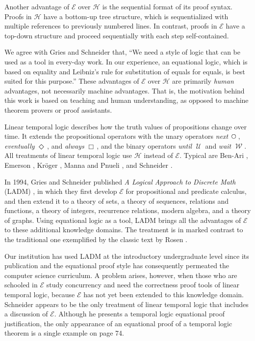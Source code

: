 \documentclass[12pt, fleqn, leqno]{article}
\newcommand{\Until}{\;\mathcal{U}\;}
\newcommand{\Wait}{\;\mathcal{W}\;}
\newcommand{\Next}{\;\,\text{\raisebox{3.5pt}{\circle{6}}}}
\newcommand{\Event}{\Diamond\,}
\newcommand{\Always}{\Box\,}
\begin{document}
Another advantage of $\mathcal{E}$ over $\mathcal{H}$ is the sequential format of its proof syntax.
Proofs in $\mathcal{H}$ have a bottom-up tree structure, which is sequentialized with multiple references to previously numbered lines.
In contrast, proofs in $\mathcal{E}$ have a top-down structure and proceed sequentially with each step self-contained.

We agree with Gries and Schneider \cite{LADM} that, ``We need a style of logic that can be used as a tool in every-day work.
In our experience, an equational logic, which is based on equality and Leibniz's rule for substitution of equals for equals, is best suited for this purpose.''
These advantages of $\mathcal{E}$ over $\mathcal{H}$ are primarily \textit{human} advantages, not necessarily machine advantages.
That is, the motivation behind this work is based on teaching and human understanding, as opposed to machine theorem provers or proof assistants.

Linear temporal logic describes how the truth values of propositions change over time.
It extends the propositional operators with the unary operators \textit{next} $\Next$, \textit{eventually} $\Event$, and \textit{always} $\Always$, and the binary operators \textit{until} $\Until$ and \textit{wait} $\Wait$.
All treatments of linear temporal logic use $\mathcal{H}$ instead of $\mathcal{E}$.
Typical are Ben-Ari \cite{Ben2}, Emerson \cite{Emer}, Kr\"{o}ger \cite{Kroger}, Manna and Pnueli \cite{Manna}, and Schneider \cite{Schn}.

In 1994, Gries and Schneider published \textit{A Logical Approach to Discrete Math} (LADM) \cite{LADM}, in which they first develop $\mathcal{E}$ for propositional and predicate calculus, and then extend it to a theory of sets, a theory of sequences, relations and functions, a theory of integers, recurrence relations, modern algebra, and a theory of graphs.
Using equational logic as a tool, LADM brings all the advantages of $\mathcal{E}$ to these additional knowledge domains.
The treatment is in marked contrast to the traditional one exemplified by the classic text by Rosen \cite{Rosen}.

Our institution has used LADM at the introductory undergraduate level since its publication and the equational proof style has consequently permeated the computer science curriculum.
A problem arises, however, when those who are schooled in $\mathcal{E}$ study concurrency and need the correctness proof tools of linear temporal logic, because $\mathcal{E}$ has not yet been extended to this knowledge domain.
Schneider \cite{Schn} appears to be the only treatment of linear temporal logic that includes a discussion of $\mathcal{E}$.
Although he presents a temporal logic equational proof justification, the only appearance of an equational proof of a temporal logic theorem is a single example on page 74.
\end{document}
